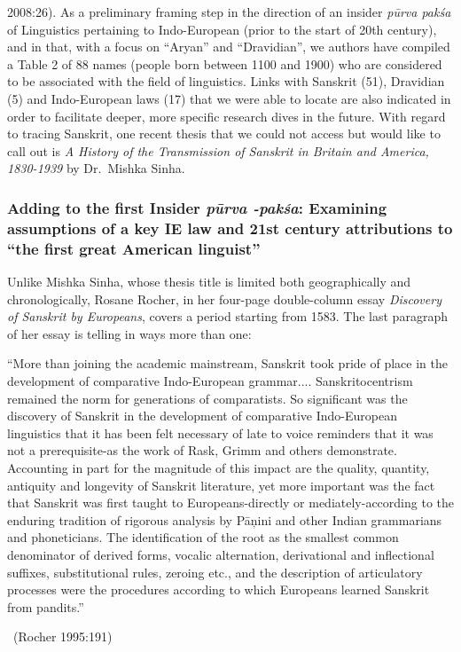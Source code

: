 2008:26). As a preliminary framing step in the direction of an insider \textit{pūrva pakśa} of Linguistics pertaining to Indo-European (prior to the start of 20th century), and in that, with a focus on “Aryan” and “Dravidian”, we authors have compiled a Table 2 of 88 names (people born between 1100 and 1900) who are considered to be associated with the field of linguistics. Links with Sanskrit (51), Dravidian (5) and Indo-European laws (17) that we were able to locate are also indicated in order to facilitate deeper, more specific research dives in the future. With regard to tracing Sanskrit, one recent thesis that we could not access but would like to call out is \textit{A History of the Transmission of Sanskrit in Britain and America, 1830-1939} by Dr.\ Mishka Sinha.


\subsubsection{Adding to the first Insider \textit{pūrva -pakśa}: Examining assumptions of a key IE law and 21st century attributions to “the first great American linguist”}

Unlike Mishka Sinha, whose thesis title is limited both geographically and chronologically, Rosane Rocher, in her four-page double-column essay \textit{Discovery of Sanskrit by Europeans}, covers a period starting from 1583. The last paragraph of her essay is telling in ways more than one:

\begin{myquote}
“More than joining the academic mainstream, Sanskrit took pride of place in the development of comparative Indo-European grammar.... Sanskritocentrism remained the norm for generations of comparatists. So significant was the discovery of Sanskrit in the development of comparative Indo-European linguistics that it has been felt necessary of late to voice reminders that it was not a prerequisite-as the work of Rask, Grimm and others demonstrate. Accounting in part for the magnitude of this impact are the quality, quantity, antiquity and longevity of Sanskrit literature, yet more important was the fact that Sanskrit was first taught to Europeans-directly or mediately-according to the enduring tradition of rigorous analysis by Pāņini and other Indian grammarians and phoneticians. The identification of the root as the smallest common denominator of derived forms, vocalic alternation, derivational and inflectional suffixes, substitutional rules, zeroing etc., and the description of articulatory processes were the procedures according to which Europeans learned Sanskrit from pandits.”

~\hfill (Rocher 1995:191)
\end{myquote}

